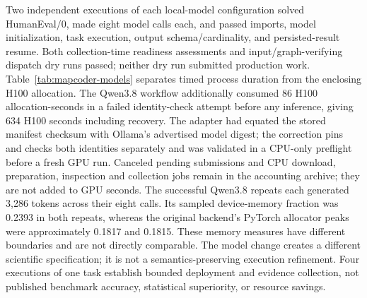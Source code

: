 Two independent executions of each local-model configuration solved HumanEval/0, made eight model calls each, and passed imports, model initialization, task execution, output schema/cardinality, and persisted-result resume. Both collection-time readiness assessments and input/graph-verifying dispatch dry runs passed; neither dry run submitted production work. Table~\ref{tab:mapcoder-models} separates timed process duration from the enclosing H100 allocation. The Qwen3.8 workflow additionally consumed 86 H100 allocation-seconds in a failed identity-check attempt before any inference, giving 634 H100 seconds including recovery. The adapter had equated the stored manifest checksum with Ollama's advertised model digest; the correction pins and checks both identities separately and was validated in a CPU-only preflight before a fresh GPU run. Canceled pending submissions and CPU download, preparation, inspection and collection jobs remain in the accounting archive; they are not added to GPU seconds. The successful Qwen3.8 repeats each generated 3,286 tokens across their eight calls. Its sampled device-memory fraction was 0.2393 in both repeats, whereas the original backend's PyTorch allocator peaks were approximately 0.1817 and 0.1815. These memory measures have different boundaries and are not directly comparable. The model change creates a different scientific specification; it is not a semantics-preserving execution refinement. Four executions of one task establish bounded deployment and evidence collection, not published benchmark accuracy, statistical superiority, or resource savings.
